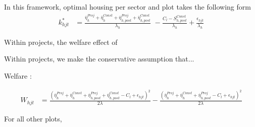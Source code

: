 \documentclass[12pt]{article}
\begin{document}
In this framework, optimal housing per sector and plot takes the following form
\begin{align*}
k_{hjt}^{*} &= \frac{    \overline{\eta}_{h}^{Proj} + \overline{\eta}_{h}^{Const} + \overline{\eta}_{h,post}^{Proj} + \overline{\eta}_{h,post}^{Const}     }{\lambda_h} \,\, - \frac{C_l-S^{Const}_{h,post} }{\lambda_h} + \frac{\epsilon_{hjt}}{\lambda_h}
\end{align*}


Within projects,  the welfare effect of 

Within projects, we make the conservative assumption that...

Welfare : 

\begin{align*}
W_{hjt}  &= \frac{( \overline{\eta}_{h}^{Proj} + \overline{\eta}_{h}^{Const} + \overline{\eta}_{h,post}^{Proj} + \overline{\eta}_{h,post}^{Const}   -C_l + \epsilon_{hjt} )^2}{2\lambda} - \frac{( \overline{\eta}_{h}^{Proj} + \overline{\eta}_{h}^{Const} + \overline{\eta}_{h,post}^{Proj}  - C_l + \epsilon_{hjt} )^2}{2\lambda}
\end{align*}

For all other plots, 

\end{document}
